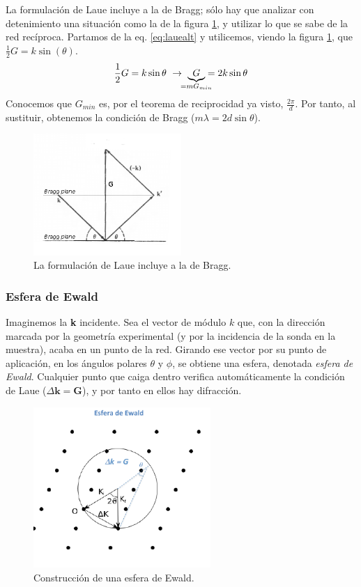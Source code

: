 La formulación de Laue incluye a la de Bragg; sólo hay que analizar con detenimiento una situación como la de la figura \ref{fig:lauebragg}, y utilizar lo que se sabe de la red recíproca.
Partamos de la eq. \ref{eq:lauealt} y utilicemos, viendo la figura
\ref{fig:lauebragg}, que $\frac{1}{2} G=k\sin(\theta)$.
\begin{equation}
  \frac{1}{2}G = k \sin \theta \ \rightarrow \ \underbrace{G}_{\mathclap{=mG_{min}}} = 2k \sin \theta 
\end{equation}
Conocemos que $G_{min}$ es, por el teorema de reciprocidad ya visto,
$\frac{2\pi}{d}$. Por tanto, al sustituir, obtenemos la condición de
Bragg ($m\lambda = 2d \sin \theta$).
\begin{figure}
  \centering
  \includegraphics[width=0.5\textwidth]{figures/lauebragg.png}
  \caption{La formulación de Laue incluye a la de Bragg.}
  \label{fig:lauebragg}
\end{figure}


\subsubsection{Esfera de Ewald}
Imaginemos la \textbf{k} incidente. Sea el vector de módulo $k$ que, con la
dirección marcada por la geometría experimental (y por la incidencia de la sonda
en la muestra), acaba en un punto de la red. Girando ese vector por su punto de
aplicación, en los ángulos polares $\theta$ y $\phi$, se obtiene una esfera,
denotada \emph{esfera de Ewald}. Cualquier punto que caiga dentro verifica
automáticamente la condición de Laue ($\Delta \mathbf{k} = \mathbf{G}$), y por tanto en ellos hay difracción.

\begin{figure}[h]
  \centering
  \includegraphics[width=0.6\textwidth]{figures/ewaldsphere.png}
  \caption{Construcción de una esfera de Ewald.}
\end{figure}


